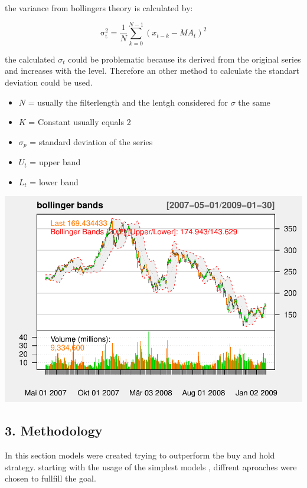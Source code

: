 \documentclass[
]{article}
\providecommand{\tightlist}{%
  \setlength{\itemsep}{0pt}\setlength{\parskip}{0pt}}
\begin{document}
the variance from bollingers theory is calculated by:

\begin{equation}
  \label{eq:variance bollingerbands}
  \mathrm{\sigma_{t}^2}=\frac{1}{N}\sum_{k=0}^{N-1}(x_{t-k} -MA_t)^2
\end{equation}

the calculated \({\sigma_t}\) could be problematic because its derived
from the original series and increases with the level. Therefore an
other method to calculate the standart deviation could be used.

\begin{itemize}
\tightlist
\item
  \({N}\) = usually the filterlength and the lentgh considered for
  \({\sigma}\) the same
\item
  \({K}\) = Constant usually equals 2
\item
  \(\sigma_p\) = standard deviation of the series
\item
  \({U_t}\) = upper band
\item
  \({L_t}\) = lower band
\end{itemize}

\begin{center}\includegraphics[width=0.7\linewidth]{00_main_files/figure-latex/chap2.8 -1} \end{center}

\newpage

\hypertarget{methodology}{%
\subsection{3. Methodology}\label{methodology}}

In this section models were created trying to outperform the buy and
hold strategy. starting with the usage of the simplest models , diffrent
aproaches were chosen to fullfill the goal.
\end{document}
